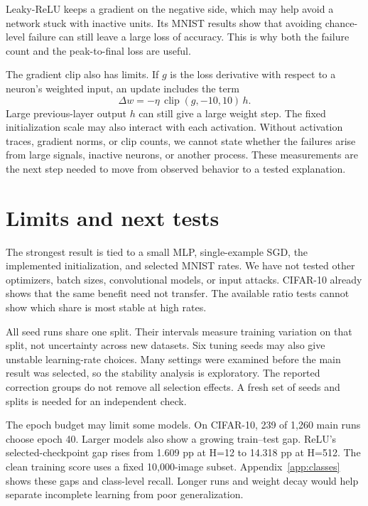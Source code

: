 \documentclass[10pt]{article}
\begin{document}
Leaky-ReLU keeps a gradient on the negative side, which may help avoid a network stuck with inactive units. Its MNIST results show that avoiding chance-level failure can still leave a large loss of accuracy. This is why both the failure count and the peak-to-final loss are useful.

The gradient clip also has limits. If $g$ is the loss derivative with respect to a neuron's weighted input, an update includes the term
\begin{equation}\Delta w=-\eta\,\operatorname{clip}(g,-10,10)\,h.\end{equation}
Large previous-layer output $h$ can still give a large weight step. The fixed initialization scale may also interact with each activation. Without activation traces, gradient norms, or clip counts, we cannot state whether the failures arise from large signals, inactive neurons, or another process. These measurements are the next step needed to move from observed behavior to a tested explanation.

\section{Limits and next tests}
The strongest result is tied to a small MLP, single-example SGD, the implemented initialization, and selected MNIST rates. We have not tested other optimizers, batch sizes, convolutional models, or input attacks. CIFAR-10 already shows that the same benefit need not transfer. The available ratio tests cannot show which share is most stable at high rates.

All seed runs share one split. Their intervals measure training variation on that split, not uncertainty across new datasets. Six tuning seeds may also give unstable learning-rate choices. Many settings were examined before the main result was selected, so the stability analysis is exploratory. The reported correction groups do not remove all selection effects. A fresh set of seeds and splits is needed for an independent check.

The epoch budget may limit some models. On CIFAR-10, 239 of 1,260 main runs choose epoch 40. Larger models also show a growing train--test gap. ReLU's selected-checkpoint gap rises from 1.609 pp at H=12 to 14.318 pp at H=512. The clean training score uses a fixed 10,000-image subset. Appendix~\ref{app:classes} shows these gaps and class-level recall. Longer runs and weight decay would help separate incomplete learning from poor generalization.
\end{document}
